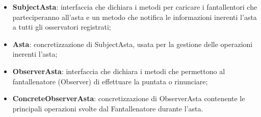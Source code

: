 \documentclass[12pt,a4paper]{article}
\begin{document}
\begin{itemize}
\item \textbf{SubjectAsta}: interfaccia che dichiara i metodi per caricare i fantallentori che parteciperanno all'asta e un metodo che notifica le informazioni inerenti l'asta a tutti gli osservatori registrati;
\item \textbf{Asta}: concretizzazione di SubjectAsta, usata per la gestione delle operazioni inerenti l'asta;
\item \textbf{ObserverAsta}: interfaccia che dichiara i metodi che permettono al fantallenatore (Observer) di effettuare la puntata o rinunciare;
\item \textbf{ConcreteObserverAsta}: concretizzazione di ObserverAsta contenente le principali operazioni svolte dal Fantallenatore durante l'asta.
\end{itemize}
\end{document}
